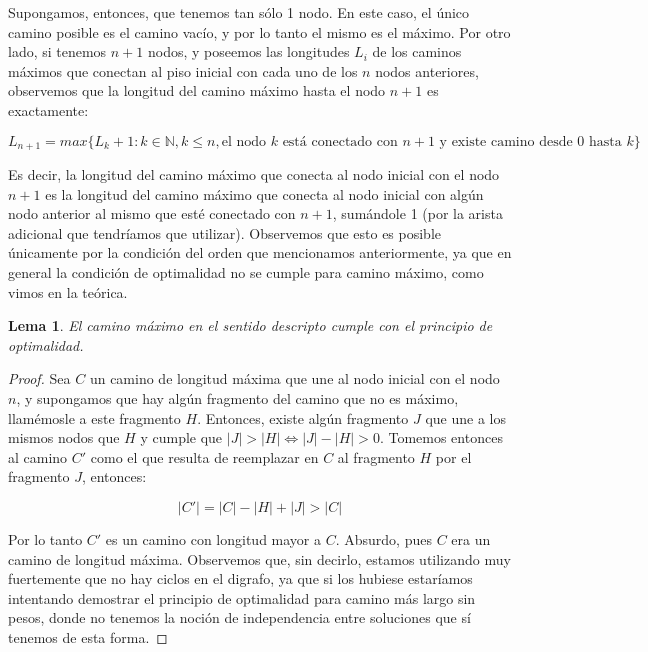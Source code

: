 \documentclass{article}
\newtheorem{lemma}{Lema}[theorem]
\theoremstyle{definition}
\theoremstyle{remark}
\begin{document}
Supongamos, entonces, que tenemos tan sólo 1 nodo. En este caso, el único camino posible es el camino vacío, y por lo tanto el mismo es el máximo. Por otro lado, si tenemos $n + 1$ nodos, y poseemos las longitudes $L_i$ de los caminos máximos que conectan al piso inicial con cada uno de los $n$ nodos anteriores, observemos que la longitud del camino máximo hasta el nodo $n + 1$ es exactamente:

$$L_{n + 1} = max\{L_k + 1 : k \in \mathbb{N}, k \leq n, \text{el nodo } k \text{ está conectado con } n + 1 \text{ y existe camino desde } 0 \text{ hasta } k\}$$

Es decir, la longitud del camino máximo que conecta al nodo inicial con el nodo $n + 1$ es la longitud del camino máximo que conecta al nodo inicial con algún nodo anterior al mismo que esté conectado con $n + 1$, sumándole 1 (por la arista adicional que tendríamos que utilizar). Observemos que esto es posible únicamente por la condición del orden que mencionamos anteriormente, ya que en general la condición de optimalidad no se cumple para camino máximo, como vimos en la teórica.

\begin{lemma}
El camino máximo en el sentido descripto cumple con el principio de optimalidad.
\end{lemma}

\begin{proof}
Sea $C$ un camino de longitud máxima que une al nodo inicial con el nodo $n$, y supongamos que hay algún fragmento del camino que no es máximo, llamémosle a este fragmento $H$. Entonces, existe algún fragmento $J$ que une a los mismos nodos que $H$ y cumple que $|J| > |H| \iff |J| - |H| > 0$. Tomemos entonces al camino $C'$ como el que resulta de reemplazar en $C$ al fragmento $H$ por el fragmento $J$, entonces:

$$|C'| = |C| - |H| + |J| > |C|$$

Por lo tanto $C'$ es un camino con longitud mayor a $C$. Absurdo, pues $C$ era un camino de longitud máxima. Observemos que, sin decirlo, estamos utilizando muy fuertemente que no hay ciclos en el digrafo, ya que si los hubiese estaríamos intentando demostrar el principio de optimalidad para camino más largo sin pesos, donde no tenemos la noción de independencia entre soluciones que sí tenemos de esta forma.
\end{proof}
\end{document}
